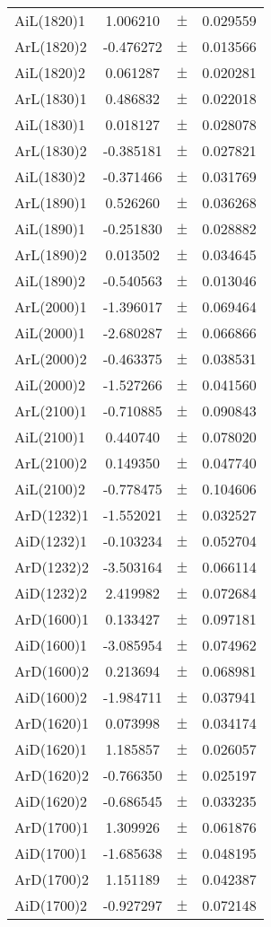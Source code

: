 \begin{table}
\begin{tiny}
\begin{tabular}{lccc}
AiL(1820)1 & 1.006210 & $\pm$ & 0.029559 \\
ArL(1820)2 & -0.476272 & $\pm$ & 0.013566 \\
AiL(1820)2 & 0.061287 & $\pm$ & 0.020281 \\
ArL(1830)1 & 0.486832 & $\pm$ & 0.022018 \\
AiL(1830)1 & 0.018127 & $\pm$ & 0.028078 \\
ArL(1830)2 & -0.385181 & $\pm$ & 0.027821 \\
AiL(1830)2 & -0.371466 & $\pm$ & 0.031769 \\
ArL(1890)1 & 0.526260 & $\pm$ & 0.036268 \\
AiL(1890)1 & -0.251830 & $\pm$ & 0.028882 \\
ArL(1890)2 & 0.013502 & $\pm$ & 0.034645 \\
AiL(1890)2 & -0.540563 & $\pm$ & 0.013046 \\
ArL(2000)1 & -1.396017 & $\pm$ & 0.069464 \\
AiL(2000)1 & -2.680287 & $\pm$ & 0.066866 \\
ArL(2000)2 & -0.463375 & $\pm$ & 0.038531 \\
AiL(2000)2 & -1.527266 & $\pm$ & 0.041560 \\
ArL(2100)1 & -0.710885 & $\pm$ & 0.090843 \\
AiL(2100)1 & 0.440740 & $\pm$ & 0.078020 \\
ArL(2100)2 & 0.149350 & $\pm$ & 0.047740 \\
AiL(2100)2 & -0.778475 & $\pm$ & 0.104606 \\
ArD(1232)1 & -1.552021 & $\pm$ & 0.032527 \\
AiD(1232)1 & -0.103234 & $\pm$ & 0.052704 \\
ArD(1232)2 & -3.503164 & $\pm$ & 0.066114 \\
AiD(1232)2 & 2.419982 & $\pm$ & 0.072684 \\
ArD(1600)1 & 0.133427 & $\pm$ & 0.097181 \\
AiD(1600)1 & -3.085954 & $\pm$ & 0.074962 \\
ArD(1600)2 & 0.213694 & $\pm$ & 0.068981 \\
AiD(1600)2 & -1.984711 & $\pm$ & 0.037941 \\
ArD(1620)1 & 0.073998 & $\pm$ & 0.034174 \\
AiD(1620)1 & 1.185857 & $\pm$ & 0.026057 \\
ArD(1620)2 & -0.766350 & $\pm$ & 0.025197 \\
AiD(1620)2 & -0.686545 & $\pm$ & 0.033235 \\
ArD(1700)1 & 1.309926 & $\pm$ & 0.061876 \\
AiD(1700)1 & -1.685638 & $\pm$ & 0.048195 \\
ArD(1700)2 & 1.151189 & $\pm$ & 0.042387 \\
AiD(1700)2 & -0.927297 & $\pm$ & 0.072148 \\
\bottomrule
\end{tabular}
\end{tiny}
\end{table}

